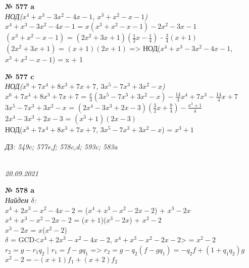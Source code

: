 \documentclass[12pt]{article}
\begin{document}
\vspace{1cm}
{
	{\textbf{№ 577 a} \vspace{.25cm}\\}
	\textit{НОД($x^4+x^3-3x^2-4x-1$, $x^3+x^2-x-1$)}\vspace{.25cm}\\
	
	$x^4+x^3-3x^2-4x-1$ = $x(x^3+x^2-x-1)-2x^2-3x-1$\\
	$(x^3+x^2-x-1)$ = $(2x^2+3x+1)(\frac{1}{2}x-\frac{1}{4})$ - $\frac{3}{4}(x+1)$\\
	$(2x^2+3x+1)$ = $(x+1)(2x+1)$ => НОД($x^4+x^3-3x^2-4x-1$, $x^3+x^2-x-1$) = x + 1
	
}

\vspace{1cm}
{
	{\textbf{№ 577 c} \vspace{.25cm}\\}
	\textit{НОД($x^6+7x^4+8x^3+7x+7$, $3x^5-7x^3+3x^2-x$)}\vspace{.25cm}\\
	
	$x^6+7x^4+8x^3+7x+7$ = $\frac{x}{3}(3x^5-7x^3+3x^2-x)-\frac{14}{3}x^4+7x^3-\frac{14}{3}x+7$\\
	$3x^5-7x^3+3x^2-x$ = $(2x^4-3x^3+2x-3)(\frac{3}{2}x+\frac{9}{4})-\frac{x^3+1}{4}$\\
	$2x^4-3x^3+2x-3$ = $(x^3+1)(2x-3)$\\
	НОД($x^6+7x^4+8x^3+7x+7$, $3x^5-7x^3+3x^2-x$) = $x^3+1$\\
	
	
}

\vspace{1cm}
\emph{ДЗ: 549c; 577e,f;  578c,d; 593c; 583a}

\newpage
{\\ 
\hfill \textit{20.09.2021}\\ \vspace{1cm}}

\vspace{.75cm}
{
	{\textbf{№ 578 a} \vspace{.25cm}\\}
\textit{Найдем $\delta$:\\}
$x^{4}+2x^{3}-x^{2}-4x-2$ = ($x^{4}+x^{3}-x^{2}-2x-2$) + $x^{3}-2x$\\
$x^{4}+x^{3}-x^{2}-2x-2$ = ($x+1$)($x^{3}-2x$) + $x^{2}-2$\\
$x^{3}-2x$ = $x$($x^{2}-2$)\\
$\delta$ = GCD<$x^{4}+2x^{3}-x^{2}-4x-2$, $x^{4}+x^{3}-x^{2}-2x-2$> = $x^{2}-2$\vspace{.2cm}\\
$r_2 = g-r_1q_2$ \quad | \quad $r_1=f-gq_1$ => $r_2=g-q_2(f-gq_1) = -q_2f + (1+q_1q_2)g$ \vspace{.1cm} \\
$x^2-2 = -(x+1)f_1 + (x+2)f_2$
}
\end{document}
